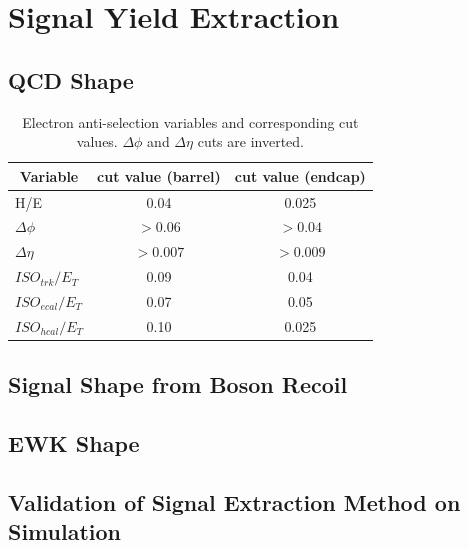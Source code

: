\section{Signal Yield Extraction}

\subsection{QCD \ETm Shape}

\begin{table}[htbp]
  \begin{center}
    \leavevmode
    \begin{tabular}{lcc} 
      \multicolumn{1}{c}{Variable} & \multicolumn{1}{c}{cut value (barrel)}& \multicolumn{1}{c}{cut value (endcap)}\\\hline
        H/E & 0.04 & 0.025 \\
        $\Delta\phi$ & $>0.06$  & $>0.04$ \\
        $\Delta\eta$ & $>0.007$ & $>0.009$\\
  $ISO_{trk} / E_T $ & 0.09 & 0.04 \\
  $ISO_{ecal}/ E_T$  & 0.07 & 0.05 \\
  $ISO_{hcal}/ E_T$  & 0.10 & 0.025\\
    \end{tabular}
    \caption{Electron anti-selection variables and corresponding cut values. $\Delta\phi$ and $\Delta\eta$ cuts are inverted.}
    \label{asym840:AScuts}
  \end{center}
\end{table}

\subsection{Signal \ETm Shape from Boson Recoil}

\subsection{EWK \ETm Shape}


\subsection{Validation of Signal Extraction Method on Simulation}

